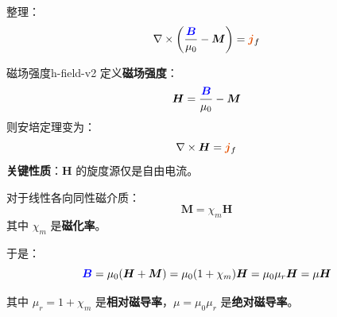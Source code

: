 \documentclass[11pt,a4paper,openany,oneside]{book}
\newcommand{\vecB}{\textcolor{blue}{\vect{B}}}
\newcommand{\vecJ}{\textcolor{cororange}{\vect{j}}}
\newcommand{\muz}{\mu_0}
\newcommand{\vect}[1]{\bm{#1}}
\newcommand{\curl}{\nabla\times}
\begin{document}
整理：
\[
\curl\left(\frac{\vecB}{\muz} - \vect{M}\right) = \vecJ_f
\]

\begin{definition}{磁场强度}{h-field-v2}
定义\textbf{磁场强度}：
\[
\vect{H} = \frac{\vecB}{\muz} - \vect{M}
\]
则安培定理变为：
\[
\curl\vect{H} = \vecJ_f
\]
\textbf{关键性质}：$\vect{H}$ 的旋度源仅是自由电流。
\end{definition}

对于线性各向同性磁介质：
\[
\vect{M} = \chi_m \vect{H}
\]
其中 $\chi_m$ 是\textbf{磁化率}。

于是：
\[
\vecB = \muz(\vect{H} + \vect{M}) = \muz(1+\chi_m)\vect{H} = \muz \mu_r\vect{H} = \mu\vect{H}
\]

其中 $\mu_r = 1 + \chi_m$ 是\textbf{相对磁导率}，$\mu = \muz \mu_r$ 是\textbf{绝对磁导率}。
\end{document}
